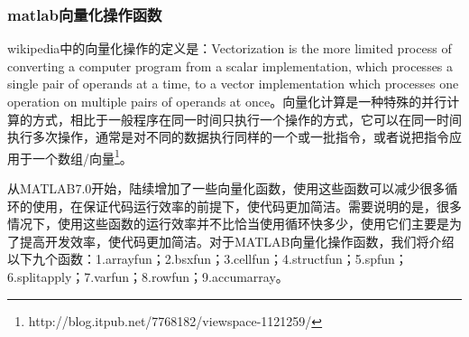         \subsubsection{matlab向量化操作函数}
            \par
            wikipedia中的向量化操作的定义是：Vectorization is the more limited process of converting a computer program from a scalar implementation, which processes a single pair of operands at a time, to a vector implementation which processes one operation on multiple pairs of operands at once。向量化计算是一种特殊的并行计算的方式，相比于一般程序在同一时间只执行一个操作的方式，它可以在同一时间执行多次操作，通常是对不同的数据执行同样的一个或一批指令，或者说把指令应用于一个数组/向量\footnote{http://blog.itpub.net/7768182/viewspace-1121259/}。
            \par
            从MATLAB7.0开始，陆续增加了一些向量化函数，使用这些函数可以减少很多循环的使用，在保证代码运行效率的前提下，使代码更加简洁。需要说明的是，很多情况下，使用这些函数的运行效率并不比恰当使用循环快多少，使用它们主要是为了提高开发效率，使代码更加简洁。对于MATLAB向量化操作函数，我们将介绍以下九个函数：1.arrayfun；2.bsxfun；3.cellfun；4.structfun；5.spfun；6.splitapply；7.varfun；8.rowfun；9.accumarray。
